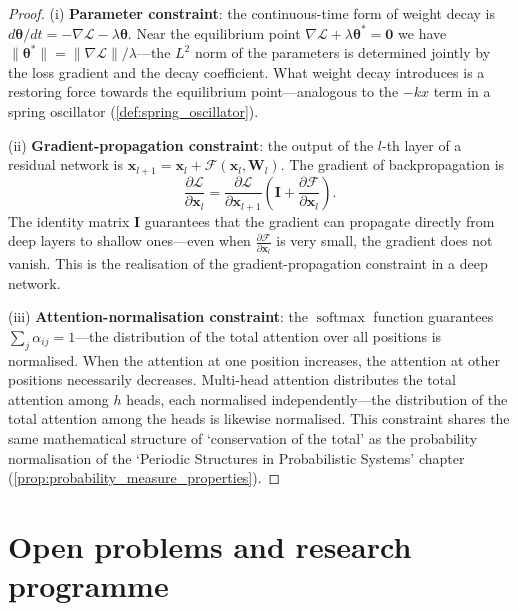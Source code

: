 \begin{proof}
(i) \textbf{Parameter constraint}: the continuous-time form of weight decay is $d\boldsymbol{\theta}/dt = -\nabla\mathcal{L} - \lambda \boldsymbol{\theta}$. Near the equilibrium point $\nabla\mathcal{L} + \lambda \boldsymbol{\theta}^* = \mathbf{0}$ we have $\|\boldsymbol{\theta}^*\| = \|\nabla\mathcal{L}\|/\lambda$---the $L^2$ norm of the parameters is determined jointly by the loss gradient and the decay coefficient. What weight decay introduces is a restoring force towards the equilibrium point---analogous to the $-kx$ term in a spring oscillator (\cref{def:spring_oscillator}).

(ii) \textbf{Gradient-propagation constraint}: the output of the $l$-th layer of a residual network is $\mathbf{x}_{l+1} = \mathbf{x}_l + \mathcal{F}(\mathbf{x}_l, \mathbf{W}_l)$. The gradient of backpropagation is
\[
\frac{\partial \mathcal{L}}{\partial \mathbf{x}_l} = \frac{\partial \mathcal{L}}{\partial \mathbf{x}_{l+1}} \left(\mathbf{I} + \frac{\partial \mathcal{F}}{\partial \mathbf{x}_l}\right).
\]
The identity matrix $\mathbf{I}$ guarantees that the gradient can propagate directly from deep layers to shallow ones---even when $\frac{\partial \mathcal{F}}{\partial \mathbf{x}_l}$ is very small, the gradient does not vanish. This is the realisation of the gradient-propagation constraint in a deep network.

(iii) \textbf{Attention-normalisation constraint}: the $\operatorname{softmax}$ function guarantees $\sum_j \alpha_{ij} = 1$---the distribution of the total attention over all positions is normalised. When the attention at one position increases, the attention at other positions necessarily decreases. Multi-head attention distributes the total attention among $h$ heads, each normalised independently---the distribution of the total attention among the heads is likewise normalised. This constraint shares the same mathematical structure of `conservation of the total' as the probability normalisation of the `Periodic Structures in Probabilistic Systems' chapter (\cref{prop:probability_measure_properties}).
\end{proof}

\section{Open problems and research programme}
\label{sec:agent_open_problems}

